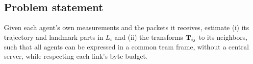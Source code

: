 \subsection{Problem statement}
Given each agent's own measurements and the packets it receives, estimate (i) its trajectory and
landmark parts in $L_i$ and (ii) the transforms $\mathbf{T}_{ij}$ to its neighbors, such that all
agents can be expressed in a common team frame, without a central server, while respecting
each link's byte budget.
